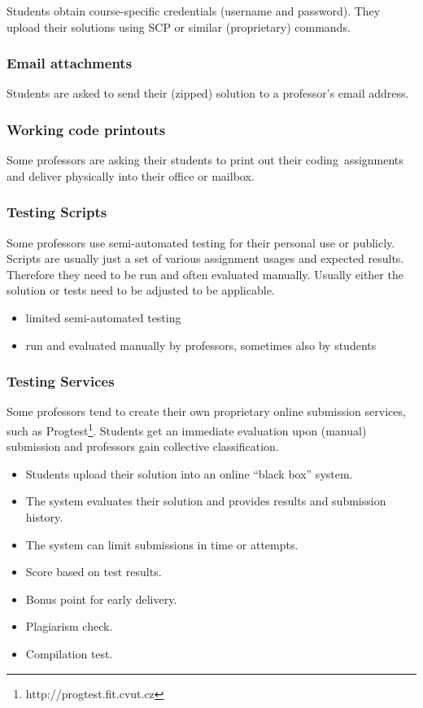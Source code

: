 {Students obtain course-specific credentials (username and password). They upload their solutions using SCP or similar (proprietary) commands.}

\subsubsection{Email attachments}

{Students are asked to send their (zipped) solution to a professor's email address.}

\subsubsection{Working code printouts}

{Some professors are asking their students to print out their }{coding}{~assignments and deliver physically into their office or mailbox.}

\subsubsection{Testing Scripts}

{Some professors use semi-automated testing for their personal use or publicly. Scripts are usually just a set of various assignment usages and expected results. Therefore they need to be run and often evaluated manually. Usually either the solution or tests need to be adjusted to be applicable.}

\begin{itemize}
\item
  {limited semi-automated testing}
\item
  {run and evaluated manually by professors, sometimes also by students}
\end{itemize}

\subsubsection{Testing Services}

{Some professors tend to create their own proprietary online submission services, such as }{Progtest\footnote{http://progtest.fit.cvut.cz}}{. Students get an immediate evaluation upon (manual) submission and professors gain collective classification.}

\begin{itemize}
\item
  {Students upload their solution into an online ``black box'' system.}
\item
  {The system evaluates their solution and provides results and submission history.}
\item
  {The system can limit submissions in time or attempts.}
\item
  {Score based on test results.}
\item
  {Bonus point for early delivery.}
\item
  {Plagiarism check.}
\item
  {Compilation test.}
\end{itemize}

